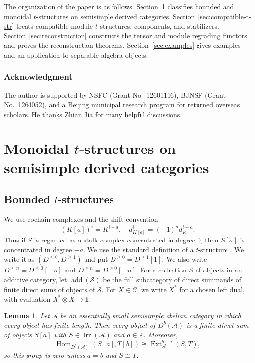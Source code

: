 \documentclass[11pt]{amsart}
\newcommand{\A}{\mathcal A}
\newcommand{\C}{\mathcal C}
\newcommand{\one}{\mathbf 1}
\newcommand{\Irr}{\operatorname{Irr}}
\newcommand{\add}{\operatorname{add}}
\DeclareMathOperator{\Hom}{Hom}
\DeclareMathOperator{\Ext}{Ext}
\newtheorem{lemma}[theorem]{Lemma}
\theoremstyle{definition}
\theoremstyle{remark}
\theoremstyle{plain}
\begin{document}
The organization of the paper is as follows. Section~\ref{sec:monoidal-t-str} classifies bounded and monoidal $t$-structures on semisimple derived categories. Section~\ref{sec:compatible-t-str} treats compatible module $t$-structures, components, and stabilizers. Section~\ref{sec:reconstruction} constructs the tensor and module regrading functors and proves the reconstruction theorems. Section~\ref{sec:examples} gives examples and an application to separable algebra objects.

\subsubsection*{Acknowledgment}

The author is supported by NSFC (Grant No.~12601116), BJNSF (Grant No.~1264052), and a Beijing municipal research program for returned overseas scholars. He thanks Zhian Jia for many helpful discussions.

\section{Monoidal \texorpdfstring{$t$}{t}-structures on semisimple derived categories}\label{sec:monoidal-t-str}

\subsection{Bounded \texorpdfstring{$t$}{t}-structures}\label{subsec:bounded-t-structures}

We use cochain complexes and the shift convention
\begin{equation*}
(K[a])^i=K^{i+a},\quad d_{K[a]}^i=(-1)^a d_K^{i+a}.
\end{equation*}
Thus if $S$ is regarded as a stalk complex concentrated in degree $0$, then $S[a]$ is concentrated in degree $-a$. We use the standard definition of a $t$-structure \cite[Section~1.3]{BBD}. We write it as $(D^{\leq0},D^{\geq1})$ and put $D^{\geq0}=D^{\geq1}[1]$. We also write $D^{\leq n}=D^{\leq0}[-n]$ and $D^{\geq n}=D^{\geq0}[-n]$. For a collection $\mathcal S$ of objects in an additive category, let $\add(\mathcal S)$ be the full subcategory of direct summands of finite direct sums of objects of $\mathcal S$. For $X\in\C$, we write $X^*$ for a chosen left dual, with evaluation $X^*\otimes X\to\one$.

\begin{lemma}\label{lem:split-derived}
Let $\A$ be an essentially small semisimple abelian category in which every object has finite length. Then every object of $D^b(\A)$ is a finite direct sum of objects $S[a]$ with $S\in\Irr(\A)$ and $a\in\mathbb Z$. Moreover,
\[
\Hom_{D^b(\A)}(S[a],T[b])\cong\Ext_{\A}^{b-a}(S,T),
\]
so this group is zero unless $a=b$ and $S\cong T$.
\end{lemma}
\end{document}
